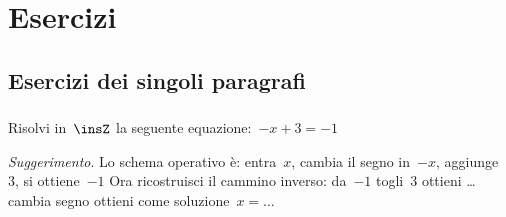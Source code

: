 
\section{Esercizi}

\subsection{Esercizi dei singoli paragrafi}

\subsubsection*{}

\begin{esercizio}
\label{ese:13.1}
Risolvi in~$\insZ$ la seguente equazione:~$-x+3=-1$

\emph{Suggerimento}. Lo schema operativo è: entra~$x$, cambia il segno in~$-x$, 
aggiunge~$3$, si ottiene~$-1$
Ora ricostruisci il cammino inverso: da~$-1$ togli~$3$ ottieni \ldots cambia 
segno ottieni come soluzione~$x = \ldots$
\end{esercizio}

\subsubsection*{}

